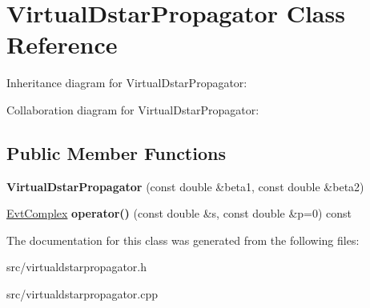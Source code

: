 \hypertarget{class_virtual_dstar_propagator}{}\section{Virtual\+Dstar\+Propagator Class Reference}
\label{class_virtual_dstar_propagator}


Inheritance diagram for Virtual\+Dstar\+Propagator\+:


Collaboration diagram for Virtual\+Dstar\+Propagator\+:
\subsection*{Public Member Functions}
\begin{DoxyCompactItemize}
\item 
\hypertarget{class_virtual_dstar_propagator_af998c38652cf62b40409c2d0ee9115c8}{}{\bfseries Virtual\+Dstar\+Propagator} (const double \&beta1, const double \&beta2)\label{class_virtual_dstar_propagator_af998c38652cf62b40409c2d0ee9115c8}

\item 
\hypertarget{class_virtual_dstar_propagator_adc6c4cc1c9b8284370e66ed0b8f525c8}{}\hyperlink{class_evt_complex}{Evt\+Complex} {\bfseries operator()} (const double \&s, const double \&p=0) const \label{class_virtual_dstar_propagator_adc6c4cc1c9b8284370e66ed0b8f525c8}

\end{DoxyCompactItemize}


The documentation for this class was generated from the following files\+:\begin{DoxyCompactItemize}
\item 
src/virtualdstarpropagator.\+h\item 
src/virtualdstarpropagator.\+cpp\end{DoxyCompactItemize}
